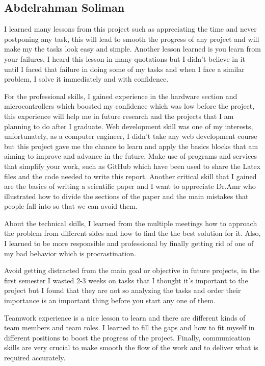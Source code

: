 \documentclass[../main.tex]{subfiles}
\begin{document}
\subsection{Abdelrahman Soliman}

I learned many lessons from this project such as appreciating 
the time and never postponing any task, this will lead to smooth 
the progress of any project and will make my the tasks look 
easy and simple. Another lesson learned is you learn from 
your failures, I heard this lesson in many quotations but I 
didn't believe in it until I faced that failure in doing some of 
my tasks and when I face a similar problem, I solve it 
immediately and with confidence.

For the professional skills, I gained experience in the hardware 
section and microcontrollers which boosted my confidence which 
was low before the project, this experience will help me in 
future research and the projects that I am planning to do after 
I graduate. 
Web development skill was one of my interests, 
unfortunately, as a computer engineer, I didn't take any web 
development course but this project gave me the chance to learn 
and apply the basics blocks that am aiming to improve 
and advance in the future. 
Make use of programs and services that simplify
your work, such as GitHub which have been used to share the 
Latex files and the code needed to write this report.
Another critical skill that I gained 
are the basics of writing a scientific paper and I want to 
appreciate Dr.Amr who illustrated how to divide the sections of 
the paper and the main mistakes that people fall into so that 
we can avoid them.

About the technical skills, I learned from the multiple meetings how to 
approach the problem from different sides and how to find the 
the best solution for it. Also, I learned to be more responsible
and professional by finally getting rid of one of my bad behavior 
which is procrastination.

Avoid getting distracted from the main goal or objective in 
future projects, in the first semester I wasted 2-3 weeks 
on tasks that I thought it's important to the project but 
I found that they are not so analyzing the tasks and 
order their importance is an important thing before
you start any one of them.

Teamwork experience is a nice lesson to learn and 
there are different kinds of team members and team roles.
I learned to fill the gaps and how to fit myself in different 
positions to boost the progress of the project. 
Finally, communication skills are very crucial to make smooth 
the flow of the work and to deliver what is required accurately.
\end{document}
